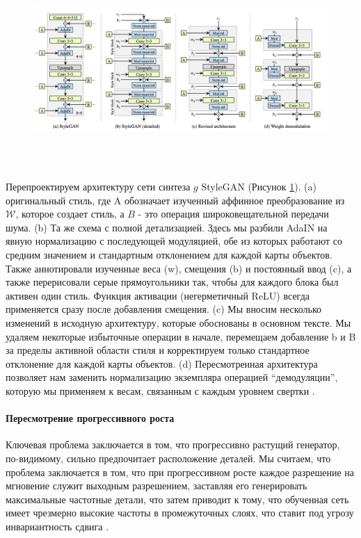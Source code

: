 \begin{figure}
    \centering
    \includegraphics[height=75mm]{fig/stylegan2_scheme.png}
    \caption{}
    \label{fig.stylegan2_scheme}
\end{figure}
Перепроектируем архитектуру сети синтеза $g$ StyleGAN (Рисунок {\color{blue} \ref{fig.stylegan2_scheme}}). (a) оригинальный стиль, где A обозначает изученный
аффинное преобразование из $\mathcal{W}$, которое создает стиль, а $B$ - это операция широковещательной передачи шума. (b) Та же схема с полной детализацией. Здесь мы разбили AdaIN на явную нормализацию с последующей модуляцией, обе из которых работают со средним значением и стандартным отклонением для каждой карты объектов. Также аннотировали изученные веса (w), смещения (b) и постоянный ввод (c), а также перерисовали серые прямоугольники так, чтобы для каждого блока был активен один стиль. Функция активации (негерметичный ReLU) всегда применяется сразу после добавления смещения. (c) Мы вносим несколько изменений в исходную архитектуру, которые обоснованы в основном тексте. Мы удаляем некоторые избыточные операции в начале, перемещаем добавление b и B за пределы активной области стиля и корректируем только стандартное отклонение для каждой карты объектов. (d) Пересмотренная архитектура позволяет нам заменить нормализацию экземпляра операцией “демодуляции”, которую мы применяем к весам, связанным с каждым уровнем свертки \cite{StyleGAN2}.

\paragraph{Пересмотрение прогрессивного роста}

Ключевая проблема заключается в том, что прогрессивно растущий генератор, по-видимому, сильно предпочитает расположение деталей. Мы считаем, что проблема заключается в том, что при прогрессивном росте каждое разрешение на мгновение служит выходным разрешением, заставляя его генерировать максимальные частотные детали, что затем приводит к тому, что обученная сеть имеет чрезмерно высокие частоты в промежуточных слоях, что ставит под угрозу инвариантность сдвига \cite{shift_invariant_networks}.

